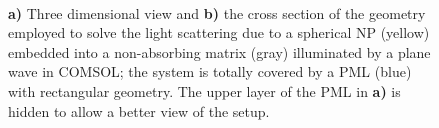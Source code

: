 \begin{figure}[b!]
	\centering
     \small
     \def\svgwidth{.8\textwidth}
     \hspace*{-.2\textwidth}
       \begin{subfigure}{.2\textwidth}\caption{ }\label{fig:setup:a}\end{subfigure}%
     \hspace*{-6em}%
       \begin{subfigure}{.78\textwidth}\caption{ }\label{fig:setup:b}\end{subfigure}
     \vspace*{-2.5em}\\
 \vspace*{0em}
\caption[Boxed Particle Setup in COMSOL]{\textbf{a)} Three dimensional view and \textbf{b)} the cross section of the geometry employed to solve the light scattering due to a  spherical NP (yellow) embedded into a non-absorbing matrix (gray) illuminated by a plane wave in COMSOL; the system is totally covered by a PML (blue) with rectangular geometry. The upper layer of the PML in \textbf{a)} is hidden to allow a better view of the setup.}
\label{fig:setup}
\end{figure}
%


